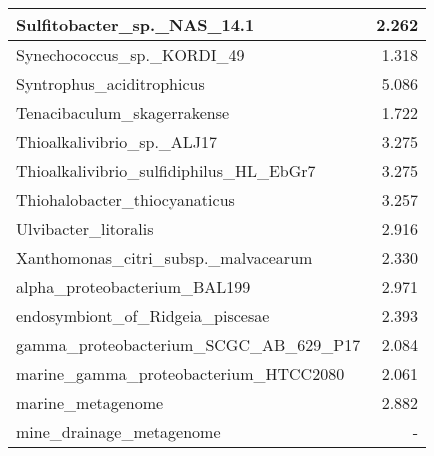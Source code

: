 \documentclass[12pt,a4paper]{article}
\begin{document}
\begin{table}[ht]
\begin{center}
\begin{tabular}{|l*{1}{|r}|}
Sulfitobacter\_sp.\_NAS\_14.1 & 2.262 \\ \hline
Synechococcus\_sp.\_KORDI\_49 & 1.318 \\ \hline
Syntrophus\_aciditrophicus & 5.086 \\ \hline
Tenacibaculum\_skagerrakense & 1.722 \\ \hline
Thioalkalivibrio\_sp.\_ALJ17 & 3.275 \\ \hline
Thioalkalivibrio\_sulfidiphilus\_HL\_EbGr7 & 3.275 \\ \hline
Thiohalobacter\_thiocyanaticus & 3.257 \\ \hline
Ulvibacter\_litoralis & 2.916 \\ \hline
Xanthomonas\_citri\_subsp.\_malvacearum & 2.330 \\ \hline
alpha\_proteobacterium\_BAL199 & 2.971 \\ \hline
endosymbiont\_of\_Ridgeia\_piscesae & 2.393 \\ \hline
gamma\_proteobacterium\_SCGC\_AB\_629\_P17 & 2.084 \\ \hline
marine\_gamma\_proteobacterium\_HTCC2080 & 2.061 \\ \hline
marine\_metagenome & 2.882 \\ \hline
mine\_drainage\_metagenome & - \\ \hline
\end{tabular}
\end{center}
\end{table}
\end{document}
